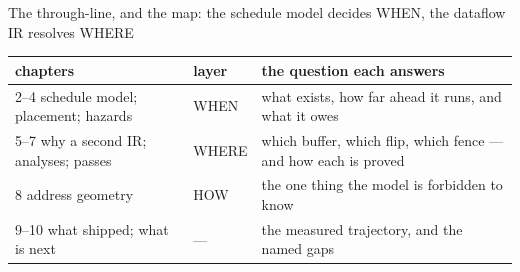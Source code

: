 \documentclass[aspectratio=169,9pt]{beamer}
\newcommand{\tsub}[1]{{\footnotesize\color{gray}#1}}
\begin{document}
\begin{frame}{The through-line, and the map: the schedule model decides WHEN, the dataflow IR resolves WHERE}
\vspace{3mm}
{\scriptsize
\begin{tabular}{@{}llp{}@{}}
\toprule
\textbf{chapters} & \textbf{layer} & \textbf{the question each answers} \\
\midrule
2--4 \tsub{schedule model; placement; hazards} & WHEN & what exists, how far ahead it runs, and what it owes \\
5--7 \tsub{why a second IR; analyses; passes} & WHERE & which buffer, which flip, which fence --- and how each is proved \\
8 \tsub{address geometry} & HOW & the one thing the model is forbidden to know \\
9--10 \tsub{what shipped; what is next} & --- & the measured trajectory, and the named gaps \\
\bottomrule
\end{tabular}}

\end{frame}
\end{document}
